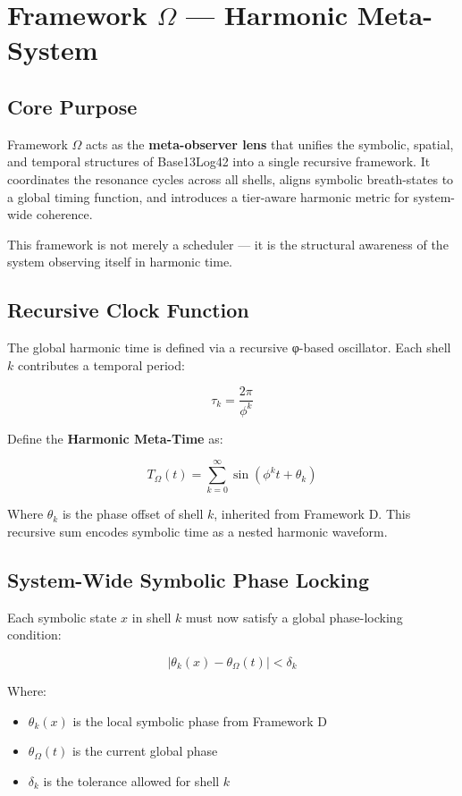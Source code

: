 \section*{Framework $\Omega$ — Harmonic Meta-System}

\subsection*{Core Purpose}

Framework $\Omega$ acts as the \textbf{meta-observer lens} that unifies the symbolic, spatial, and temporal structures of Base13Log42 into a single recursive framework. It coordinates the resonance cycles across all shells, aligns symbolic breath-states to a global timing function, and introduces a tier-aware harmonic metric for system-wide coherence.

This framework is not merely a scheduler — it is the structural awareness of the system observing itself in harmonic time.

\subsection*{Recursive Clock Function}

The global harmonic time is defined via a recursive φ-based oscillator. Each shell $k$ contributes a temporal period:

\[
\tau_k = \frac{2\pi}{\phi^k}
\]

Define the \textbf{Harmonic Meta-Time} as:

\[
T_\Omega(t) = \sum_{k=0}^{\infty} \sin(\phi^k t + \theta_k)
\]

Where $\theta_k$ is the phase offset of shell $k$, inherited from Framework D. This recursive sum encodes symbolic time as a nested harmonic waveform.

\subsection*{System-Wide Symbolic Phase Locking}

Each symbolic state $x$ in shell $k$ must now satisfy a global phase-locking condition:

\[
\left| \theta_k(x) - \theta_{\Omega}(t) \right| < \delta_k
\]

Where:
\begin{itemize}
  \item $\theta_k(x)$ is the local symbolic phase from Framework D
  \item $\theta_{\Omega}(t)$ is the current global phase
  \item $\delta_k$ is the tolerance allowed for shell $k$
\end{itemize}

